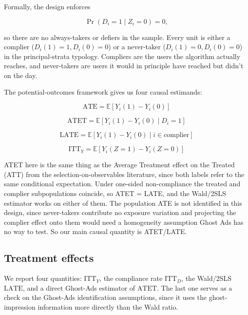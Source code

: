 Formally, the design enforces

\[
\Pr(D_i = 1 \mid Z_i = 0) = 0,
\]

so there are no always-takers or defiers in the sample. Every unit is
either a complier (\(D_i(1) = 1, D_i(0) = 0\)) or a never-taker
(\(D_i(1) = 0, D_i(0) = 0\)) in the principal-strata typology. Compliers
are the users the algorithm actually reaches, and never-takers are users
it would in principle have reached but didn't on the day.

The potential-outcomes framework gives us four causal estimands:

\[
\text{ATE}    = \mathbb{E}[Y_i(1) - Y_i(0)]
\]

\[
\text{ATET}   = \mathbb{E}[Y_i(1) - Y_i(0) \mid D_i = 1]
\]

\[
\text{LATE}   = \mathbb{E}[Y_i(1) - Y_i(0) \mid i \in \text{complier}]
\]

\[
\text{ITT}_Y  = \mathbb{E}[Y_i(Z=1) - Y_i(Z=0)]
\]

ATET here is the same thing as the Average Treatment effect on the
Treated (ATT) from the selection-on-observables literature, since both
labels refer to the same conditional expectation. Under one-sided
non-compliance the treated and complier subpopulations coincide, so ATET
= LATE, and the Wald/2SLS estimator works on either of them. The
population ATE is not identified in this design, since never-takers
contribute no exposure variation and projecting the complier effect onto
them would need a homogeneity assumption Ghost Ads has no way to test.
So our main causal quantity is ATET/LATE.

\subsection{Treatment effects}

We report four quantities: \(\text{ITT}_Y\), the compliance rate
\(\text{ITT}_D\), the Wald/2SLS \(\text{LATE}\), and a direct Ghost-Ads
estimator of \(\text{ATET}\). The last one serves as a check on the
Ghost-Ads identification assumptions, since it uses the ghost-impression
information more directly than the Wald ratio.

